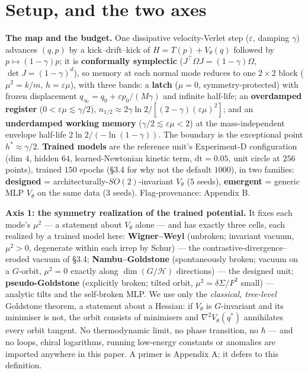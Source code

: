 \documentclass[10pt]{article}
\begin{document}
\section{Setup, and the two axes}

\textbf{The map and the budget.} One dissipative velocity-Verlet step ($\varepsilon$, damping $\gamma$) advances $(q,p)$ by a kick--drift--kick of $H=T(p)+V_\theta(q)$ followed by $p\mapsto(1-\gamma)p$; it is \textbf{conformally symplectic} ($J^\top\Omega J=(1-\gamma)\Omega$, $\det J=(1-\gamma)^d$), so memory at each normal mode reduces to one $2\times2$ block ($\mu^2=k/m$, $h=\varepsilon\mu$), with three bands: a \textbf{latch} ($\mu=0$, symmetry-protected) with frozen displacement $q_\infty=q_0+\varepsilon p_0/(M\gamma)$ and infinite half-life; an \textbf{overdamped register} ($0<\varepsilon\mu\lesssim\gamma/2$), $n_{1/2}\approx2\gamma\ln2/[(2-\gamma)(\varepsilon\mu)^2]$; and an \textbf{underdamped working memory} ($\gamma/2\lesssim\varepsilon\mu<2$) at the mass-independent envelope half-life $2\ln2/(-\ln(1-\gamma))$. The boundary is the exceptional point $h^*\approx\gamma/2$. \textbf{Trained models} are the reference unit's Experiment-D configuration (dim $4$, hidden $64$, learned-Newtonian kinetic term, $\mathrm{dt}=0.05$, unit circle at $256$ points), trained $150$ epochs (\S3.4 for why not the default $1000$), in two families: \textbf{designed} = architecturally-$SO(2)$-invariant $V_\theta$ ($5$ seeds), \textbf{emergent} = generic MLP $V_\theta$ on the same data ($3$ seeds). Flag-provenance: Appendix B.

\textbf{Axis 1: the symmetry realization of the trained potential.} It fixes each mode's $\mu^2$ --- a statement about $V_\theta$ alone --- and has exactly three cells, each realized by a trained model here: \textbf{Wigner--Weyl} (unbroken; invariant vacuum, $\mu^2>0$, degenerate within each irrep by Schur) --- the contrastive-divergence--eroded vacuum of \S3.4; \textbf{Nambu--Goldstone} (spontaneously broken; vacuum on a $G$-orbit, $\mu^2=0$ exactly along $\dim(G/\mathcal H)$ directions) --- the designed unit; \textbf{pseudo-Goldstone} (explicitly broken; tilted orbit, $\mu^2=\delta\Sigma/F^2$ small) --- analytic tilts and the self-broken MLP. We use only the \emph{classical, tree-level} Goldstone theorem, a statement about a Hessian: if $V_\theta$ is $G$-invariant and its minimiser is not, the orbit consists of minimisers and $\nabla^2V_\theta(q^*)$ annihilates every orbit tangent. No thermodynamic limit, no phase transition, no $\hbar$ --- and no loops, chiral logarithms, running low-energy constants or anomalies are imported anywhere in this paper. A primer is Appendix A; it defers to this definition.
\end{document}
